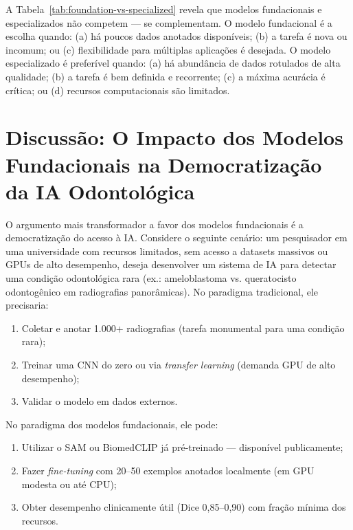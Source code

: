 A Tabela~\ref{tab:foundation-vs-specialized} revela que modelos fundacionais e especializados não competem --- se complementam. O modelo fundacional é a escolha quando: (a) há poucos dados anotados disponíveis; (b) a tarefa é nova ou incomum; ou (c) flexibilidade para múltiplas aplicações é desejada. O modelo especializado é preferível quando: (a) há abundância de dados rotulados de alta qualidade; (b) a tarefa é bem definida e recorrente; (c) a máxima acurácia é crítica; ou (d) recursos computacionais são limitados.

\section{Discussão: O Impacto dos Modelos Fundacionais na Democratização da IA Odontológica}

O argumento mais transformador a favor dos modelos fundacionais é a democratização do acesso à IA. Considere o seguinte cenário: um pesquisador em uma universidade com recursos limitados, sem acesso a datasets massivos ou GPUs de alto desempenho, deseja desenvolver um sistema de IA para detectar uma condição odontológica rara (ex.: ameloblastoma vs. queratocisto odontogênico em radiografias panorâmicas). No paradigma tradicional, ele precisaria:

\begin{enumerate}
    \item Coletar e anotar 1.000+ radiografias (tarefa monumental para uma condição rara);
    \item Treinar uma CNN do zero ou via \textit{transfer learning} (demanda GPU de alto desempenho);
    \item Validar o modelo em dados externos.
\end{enumerate}

No paradigma dos modelos fundacionais, ele pode:
\begin{enumerate}
    \item Utilizar o SAM ou BiomedCLIP já pré-treinado --- disponível publicamente;
    \item Fazer \textit{fine-tuning} com 20--50 exemplos anotados localmente (em GPU modesta ou até CPU);
    \item Obter desempenho clinicamente útil (Dice 0,85--0,90) com fração mínima dos recursos.
\end{enumerate}


